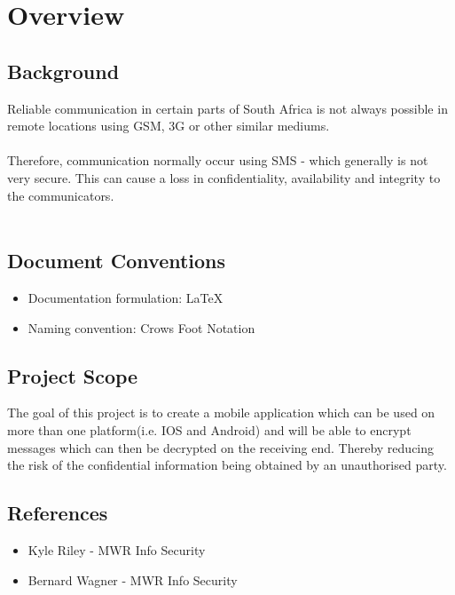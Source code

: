 \documentclass[12pt, a4paper]{scrartcl}
\begin{document}





\tableofcontents

\newpage

\section{Overview}

\subsection{Background}
Reliable communication in certain parts of South Africa is not always possible in remote locations using GSM, 3G or other similar mediums.\\
\textbf{\\}
Therefore, communication normally occur using SMS - which generally is not very secure. This can cause a loss in confidentiality, availability and integrity to the communicators.\\
\textbf{\\}


\subsection{Document Conventions}
\begin{itemize}
\item Documentation formulation: LaTeX
\item Naming convention: Crows Foot Notation
\end{itemize}


\subsection{Project Scope}
The goal of this project is to create a mobile application which can be used on more than one platform(i.e. IOS and Android) and will be able to encrypt messages which can then be decrypted on the receiving end. Thereby reducing the risk of the confidential information being obtained by an unauthorised party.

\subsection{References}
\begin{itemize}
\item{Kyle Riley - MWR Info Security}
\item{Bernard Wagner - MWR Info Security}
\end{itemize}


\textbf{\\}









\end{document}
